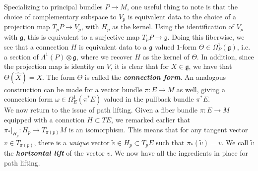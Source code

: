 \documentclass[abstract=on,twoside]{scrreprt}
\begin{document}
Specializing to principal bundles $P \to M$, one
useful thing to note is that the choice of complementary subspace to $V_p$
is equivalent data to the choice of a projection map $T_pP \to V_p$, with $H_p$ as
the kernel. Using the identification of $V_p$ with $\mathfrak{g}$, this is
equivalent to a surjective map $T_pP \to \mathfrak{g}$. Doing this fiberwise, we
see that a connection $H$ is equivalent data to a $\mathfrak{g}$ valued $1$-form
$\Theta \in \Omega^1_P(\mathfrak{g})$, i.e. a section of
$\Lambda^1(P) \otimes \mathfrak{g}$, where we recover $H$ as the kernel of $\Theta$.
In addition, since the projection map is identity on $V$, it is clear that
for $X \in \mathfrak{g}$, we have that $\Theta(\widehat{X}) = X$. The form
$\Theta$ is called the \textbf{\textit{connection form}}. An analogous construction
can be made for a vector bundle $\pi: E \to M$ as well, giving a connection
form $\omega \in \Omega_E^1(\pi^*E)$ valued in the pullback bundle $\pi^*E$. \\
%

We now return to the issue of path lifting. Given a fiber bundle $\pi : E \to M$
equipped with a connction $H \subset TE$, we remarked earlier that
$\pi_*\vert_{H_p} : H_p \to T_{\pi(p)}M$ is an isomorphism. This means that for
any tangent vector $v \in T_{\pi(p)}$, there is a \emph{unique} vector
$\tilde{v} \in H_p \subset T_pE$ such that $\pi_*(\tilde{v}) = v$. We call
$\tilde{v}$ the \textbf{\textit{horizontal lift}} of the vector $v$. We
now have all the ingredients in place for path lifting. \\
\end{document}
